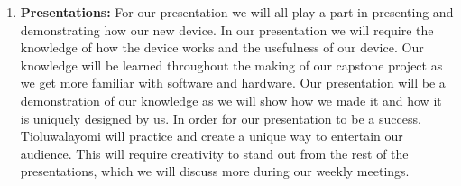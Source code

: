 \documentclass[12pt]{article}
\begin{document}
\begin{enumerate}
  \newpage
  
  \item \textbf{Presentations:} For our presentation we will all play a part in presenting and demonstrating how our new device. In our presentation we will require the knowledge of how the device works and the usefulness of our device. Our knowledge will be learned throughout the making of our capstone project as we get more familiar with software and hardware. Our presentation will be a demonstration of our knowledge as we will show how we made it and how it is uniquely designed by us. In order for our presentation to be a success, Tioluwalayomi will practice and create a unique way to entertain our audience. This will require creativity to stand out from the rest of the presentations, which we will discuss more during our weekly meetings.
  
\end{enumerate}
\end{document}
